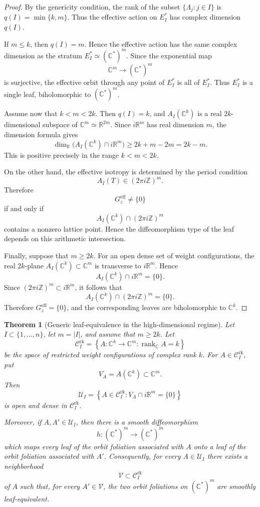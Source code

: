 \documentclass[11pt]{amsart}
\newtheorem{theorem}{Theorem}[section]
\theoremstyle{definition}
\theoremstyle{remark}
\newcommand{\Z}{\mathbb{Z}}
\newcommand{\C}{\mathbb{C}}
\newcommand{\R}{\mathbb{R}}
\DeclareMathOperator{\rank}{rank}
\newcommand{\stratSS}[1]{E_{#1}^*}
\newcommand{\stratS}[1]{\stratSS{#1}}
\begin{document}
\begin{proof}
	By the genericity condition, the rank of the subset $\{\Lambda_j:j\in I\}$ is $q(I)=\min\{k,m\}.$
	Thus the effective action on $\stratS{I}$ has complex dimension $q(I)$.

	If $m\le k$, then $q(I)=m$.
	Hence the effective action has the same complex dimension as the stratum $\stratS{I}\simeq(\C^*)^m$.
	Since the exponential map 
	\[
		\C^m\longrightarrow(\C^*)^m
	\] 
	is surjective, the effective orbit through any point of $\stratS{I}$ is all of $\stratS{I}$.
	Thus $\stratS{I}$ is a single leaf, biholomorphic to $(\C^*)^m$.

	Assume now that $k<m<2k$.
	Then $q(I)=k$, and $A_I(\C^k)$ is a real $2k$-dimensional subspace of $\C^m\simeq\R^{2m}$.
	Since $i\R^m$ has real dimension $m$, the dimension formula gives 
	$$ 
		\dim_\R\bigl(A_I(\C^k)\cap i\R^m\bigr) \ge 2k+m-2m = 2k-m.
	$$
	This is positive precisely in the range $k<m<2k$.

	On the other hand, the effective isotropy is determined by the period condition 
	$$ 
		A_I(T)\in(2\pi i\Z)^m.
	$$
	Therefore
	$$
		G_z^{\mathrm{eff}}\neq\{0\}
	$$
	if and only if
	$$
		A_I(\C^k)\cap(2\pi i\Z)^m
	$$
	contains a nonzero lattice point.
	Hence the diffeomorphism type of the leaf depends on this arithmetic intersection.

	Finally, suppose that $m\ge 2k$.
	For an open dense set of weight configurations, the real $2k$-plane $A_I(\C^k)\subset\C^m$ is transverse to $i\R^m$.
	Hence 
	$$ 
		A_I(\C^k)\cap i\R^m=\{0\}.
	$$
	Since $(2\pi i\Z)^m\subset i\R^m$, it follows that
	$$
		A_I(\C^k)\cap(2\pi i\Z)^m=\{0\}.
	$$
	Therefore $G_z^{\mathrm{eff}}=\{0\}$, and the corresponding leaves are biholomorphic to $\C^k$.
\end{proof}

\begin{theorem}[Generic leaf-equivalence in the high-dimensional regime]
	\label{thm:high-regime-stability}
	Let $I\subset\{1,\dots,n\}$, let $m=|I|$, and assume that $m\geq2k$.
	Let
	\[
		\mathcal C_I^{\mathrm{rk}} = \left\{ A:\C^k\longrightarrow\C^m: \rank_{\C}A=k \right\}
	\]
	be the space of restricted weight configurations of complex rank $k$.
	For $A\in\mathcal C_I^{\mathrm{rk}}$, put
	\[
		V_A=A(\C^k)\subset\C^m.
	\]
	Then
	\[
		\mathcal U_I = \left\{ A\in\mathcal C_I^{\mathrm{rk}}: V_A\cap i\R^m=\{0\} \right\}
	\]
	is open and dense in $\mathcal C_I^{\mathrm{rk}}$.

	Moreover, if $A,A'\in\mathcal U_I$, then there is a smooth diffeomorphism
	\[
		h:(\C^*)^m\longrightarrow(\C^*)^m
	\]
	which maps every leaf of the orbit foliation associated with $A$ onto a leaf of the orbit foliation associated with $A'$.
	Consequently, for every $A\in\mathcal U_I$ there exists a neighborhood
	\[
		\mathcal V\subset\mathcal C_I^{\mathrm{rk}}
	\]
	of $A$ such that, for every $A'\in\mathcal V$, the two orbit foliations on $(\C^*)^m$ are smoothly leaf-equivalent.
\end{theorem}
\end{document}
